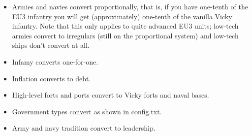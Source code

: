 \documentclass[12pt]{article}
\begin{document}
\begin{itemize}
\item Armies and navies convert proportionally, that is, if you have
  one-tenth of the EU3 infantry you will get (approximately) one-tenth
  of the vanilla Vicky infantry. Note that this only applies to quite
  advanced EU3 units; low-tech armies convert to irregulars (still on
  the proportional system) and low-tech ships don't convert at all. 
\item Infamy converts one-for-one. 
\item Inflation converts to debt.
\item High-level forts and ports convert to Vicky forts and naval
  bases.  
\item Government types convert as shown in config.txt. 
\item Army and navy tradition convert to leadership. 
\end{itemize}
\end{document}
